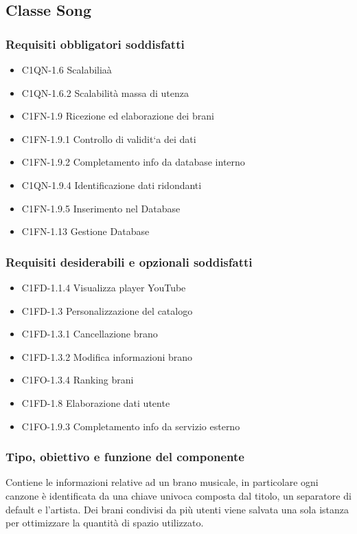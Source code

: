 \subsection{Classe Song}
\subsubsection*{Requisiti obbligatori soddisfatti}
\begin{itemize}
    \item C1QN-1.6 Scalabilia\`a
    \item C1QN-1.6.2 Scalabilit\`a massa di utenza
	\item C1FN-1.9 Ricezione ed elaborazione dei brani
	\item C1FN-1.9.1 Controllo di validit`a dei dati
	\item C1FN-1.9.2 Completamento info da database interno
	\item C1QN-1.9.4 Identificazione dati ridondanti
	\item C1FN-1.9.5 Inserimento nel Database
	\item C1FN-1.13 Gestione Database
\end{itemize}
\subsubsection*{Requisiti desiderabili e opzionali soddisfatti}
\begin{itemize}
    \item C1FD-1.1.4 Visualizza player YouTube
    \item C1FD-1.3 Personalizzazione del catalogo
    \item C1FD-1.3.1 Cancellazione brano
    \item C1FD-1.3.2 Modifica informazioni brano
    \item C1FO-1.3.4 Ranking brani
    \item C1FD-1.8 Elaborazione dati utente
    \item C1FO-1.9.3 Completamento info da servizio esterno
\end{itemize}
\subsubsection*{Tipo, obiettivo e funzione del componente} Contiene le
informazioni relative ad un brano musicale, in particolare ogni canzone \`e
identificata da una chiave univoca composta dal titolo, un separatore di default
e l'artista. Dei brani condivisi da pi\`u utenti viene salvata una sola istanza
per ottimizzare la quantit\`a di spazio utilizzato.
